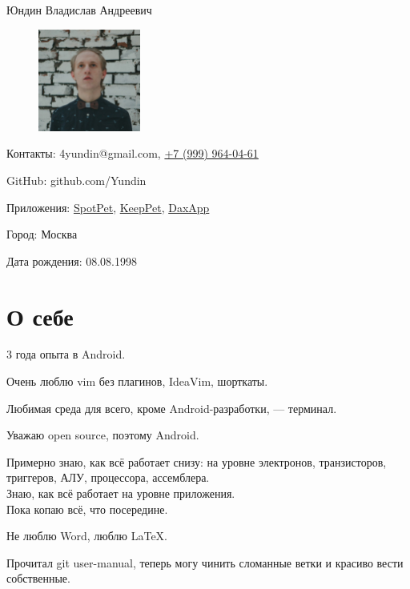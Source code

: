 \documentclass[a4paper,12pt]{article}
\begin{document}
    {\huge Юндин Владислав Андреевич}

    \setlength\intextsep{0pt}
    \begin{figure}
        \includegraphics[width=0.3\textwidth]{avatar_square}
    \end{figure}

    \bigskip
    Контакты: 4yundin@gmail.com, \href{tel:+79999640461}{\color{black}+7 (999) 964-04-61}\par
    GitHub: github.com/Yundin
    
    Приложения: \href{https://play.google.com/store/apps/details?id=com.juntoteam.spotpet}{SpotPet}, \href{https://play.google.com/store/apps/details?id=com.juntoteam.keeppet}{KeepPet}, \href{https://play.google.com/store/apps/details?id=com.app.qavala1}{DaxApp}
    
    Город: Москва\par
    Дата рождения: 08.08.1998\par

    \vspace{7ex}
    \section*{О себе}

    3 года опыта в Android.

    Очень люблю vim без плагинов, IdeaVim, шорткаты. 

    Любимая среда для всего, кроме Android-разработки, --- терминал.

    Уважаю open source, поэтому Android.

    Примерно знаю, как всё работает снизу: на уровне электронов, транзисторов, триггеров, АЛУ, процессора, ассемблера.\\
    Знаю, как всё работает на уровне приложения.\\
    Пока копаю всё, что посередине.

    Не люблю Word, люблю \LaTeX.

    Прочитал git user-manual, теперь могу чинить сломанные ветки и красиво вести собственные.
\end{document}

